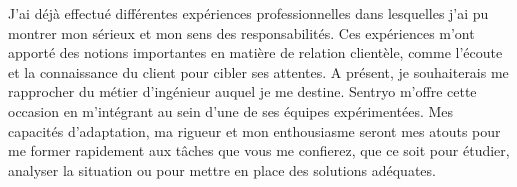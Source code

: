 \documentclass[11pt, a4paper]{awesome-cv}
\begin{document}
\begin{cvletter}
\vspace{2mm} 

J'ai déjà effectué différentes expériences professionnelles dans lesquelles j'ai pu montrer mon sérieux et mon sens des responsabilités. Ces expériences m'ont apporté des notions importantes en matière de relation clientèle, comme l'écoute et la connaissance du client pour cibler ses attentes. A présent, je souhaiterais me rapprocher du métier d'ingénieur auquel je me destine. Sentryo m'offre cette occasion en m'intégrant au sein d'une de ses équipes expérimentées. Mes capacités d'adaptation, ma rigueur et mon enthousiasme seront mes atouts pour me former rapidement aux tâches que vous me confierez, que ce soit pour étudier, analyser la situation ou pour mettre en place des solutions adéquates.




\end{cvletter}


\makeletterclosing
\end{document}

